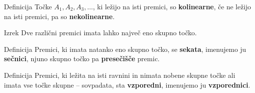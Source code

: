 

        \begin{frame}
            \begin{alertblock}{Definicija}
                Točke $A_1, A_2, A_3, \dots$, ki ležijo na isti premici, so \textbf{kolinearne}, 
                če ne ležijo na isti premici, pa so \textbf{nekolinearne}.
            \end{alertblock}

            \begin{block}{Izrek}
                Dve različni premici imata lahko največ eno skupno točko.
            \end{block}

            \begin{alertblock}{Definicija}
                Premici, ki imata natanko eno skupno točko, se \textbf{sekata}, imenujemo ju \textbf{sečnici},
                njuno skupno točko pa \textbf{presečišče} premic.
            \end{alertblock}

            \begin{alertblock}{Definicija}
                Premici, ki ležita na isti ravnini in nimata nobene skupne točke ali imata vse točke skupne -- sovpadata, sta \textbf{vzporedni}, imenujemo ju \textbf{vzporednici}.
            \end{alertblock}
        \end{frame}


